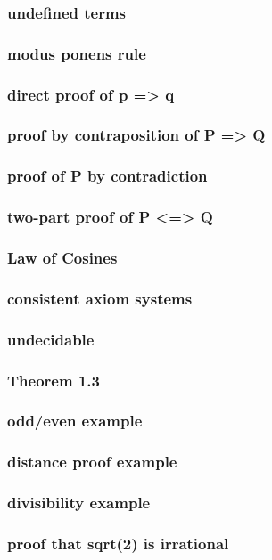 \documentclass[a4paper]{article}
\begin{document}
\subsubsection*{undefined terms}
\subsubsection*{modus ponens rule}
\subsubsection*{direct proof of p => q}
\subsubsection*{proof by contraposition of P => Q}
\subsubsection*{proof of P by contradiction}
\subsubsection*{two-part proof of P <=> Q}
\subsubsection*{Law of Cosines}
\subsubsection*{consistent axiom systems}
\subsubsection*{undecidable}
\subsubsection*{Theorem 1.3}
\subsubsection*{odd/even example}
\subsubsection*{distance proof example}
\subsubsection*{divisibility example}
\subsubsection*{proof that sqrt(2) is irrational}
\end{document}
